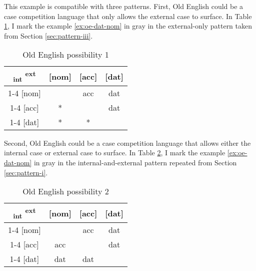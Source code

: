 This example is compatible with three patterns. First, Old English could be a case competition language that only allows the external case to surface. In Table \ref{tbl:oe-poss1}, I mark the example \ref{ex:oe-dat-nom} in gray in the external-only pattern taken from Section \ref{sec:pattern-iii}.

 \begin{table}[H]
   \center
   \caption{Old English possibility 1}
   \begin{tabular}{c|c|c|c}
     \toprule
     \textsubscript{\ac{int}} \textsuperscript{\ac{ext}}
            & [\ac{nom}]
            & [\ac{acc}]
            & [\ac{dat}]
            \\ \cmidrule{1-4}
        [\ac{nom}]
            & \xcancel{\phantom{xx}}
            & \ac{acc}
            & \cellcolor{LG}\ac{dat}
            \\ \cmidrule{1-4}
        [\ac{acc}]
            & *
            & \xcancel{\phantom{xx}}
            & \ac{dat}
            \\ \cmidrule{1-4}
        [\ac{dat}]
            & *
            & *
            & \xcancel{\phantom{xx}}
            \\
      \bottomrule
   \end{tabular}
     \label{tbl:oe-poss1}
 \end{table}

Second, Old English could be a case competition language that allows either the internal case or external case to surface. In Table \ref{tbl:oe-poss2}, I mark the example \ref{ex:oe-dat-nom} in gray in the internal-and-external pattern repeated from Section \ref{sec:pattern-i}.

  \begin{table}[H]
    \center
    \caption{Old English possibility 2}
    \begin{tabular}{c|c|c|c}
      \toprule
      \textsubscript{\ac{int}} \textsuperscript{\ac{ext}}
             & [\ac{nom}]
             & [\ac{acc}]
             & [\ac{dat}]
             \\ \cmidrule{1-4}
         [\ac{nom}]
             & \xcancel{\phantom{xx}}
             & \ac{acc}
             & \cellcolor{LG}\ac{dat}
             \\ \cmidrule{1-4}
         [\ac{acc}]
             & \ac{acc}
             & \xcancel{\phantom{xx}}
             & \ac{dat}
             \\ \cmidrule{1-4}
         [\ac{dat}]
             & \ac{dat}
             & \ac{dat}
             & \xcancel{\phantom{xx}}
             \\
       \bottomrule
    \end{tabular}
      \label{tbl:oe-poss2}
  \end{table}

